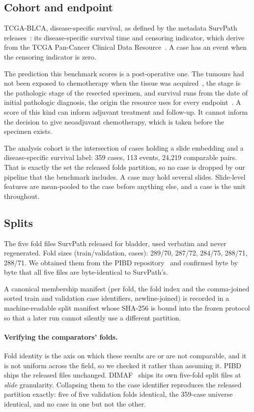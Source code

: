 \documentclass[unnumsec,webpdf,contemporary,large]{oup-authoring-template}
\begin{document}
\subsection{Cohort and endpoint}

TCGA-BLCA, disease-specific survival, as defined by the metadata SurvPath
releases~\citep{jaume2024survpath}: its disease-specific survival time and censoring
indicator, which derive from the
TCGA Pan-Cancer Clinical Data Resource~\citep{liu2018tcgacdr}. A case has an event when
the censoring indicator is zero.

The prediction this benchmark scores is a post-operative one. The tumours had not been exposed
to chemotherapy when the tissue was acquired~\citep{robertson2017blca}, the stage is the
pathologic stage of the resected specimen, and survival runs from the date of initial pathologic
diagnosis, the origin the resource uses for every endpoint~\citep{liu2018tcgacdr}. A score of this
kind can inform adjuvant treatment and follow-up. It cannot inform the decision to give
neoadjuvant chemotherapy, which is taken before the specimen exists.

The analysis cohort is the intersection of cases holding a slide embedding and a disease-specific
survival label: 359 cases, 113 events, 24{,}219 comparable pairs. That is exactly the set
the released folds partition, so no case is dropped by our pipeline that the benchmark includes.
A case may hold several slides. Slide-level features are mean-pooled to the case before anything
else, and a case is the unit throughout.

\subsection{Splits}

The five fold files SurvPath released for bladder, used verbatim and never regenerated.
Fold sizes (train/validation, cases): 289/70, 287/72, 284/75, 288/71, 288/71. We obtained them from
the PIBD repository~\citep{zhang2024pibd} and confirmed byte by byte that all five files are
byte-identical to SurvPath's.

A canonical membership manifest (per fold, the fold index and the comma-joined sorted train and validation case identifiers, newline-joined) is recorded in
a machine-readable split manifest whose SHA-256 is bound into the frozen protocol so that a
later run cannot silently use a different partition.

\paragraph{Verifying the comparators' folds.} Fold identity is the axis on which these results are
or are not comparable, and it is not uniform across the field, so we checked it rather than assuming
it. PIBD ships the released files unchanged. DIMAF~\citep{eijpe2025dimaf} ships
its own five-fold split files at \emph{slide}
granularity. Collapsing them to the case identifier reproduces the released partition exactly: five of five validation folds identical, the 359-case universe identical, and no case in one but
not the other.
\end{document}
